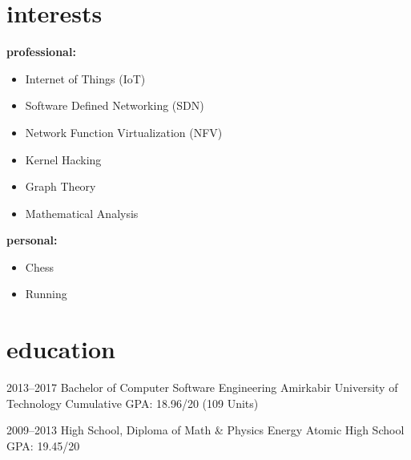 \documentclass[]{friggeri-cv} %
\begin{document}

\section{interests}
\textbf{professional:}
\begin{itemize}
	\item Internet of Things (IoT)
	\item Software Defined Networking (SDN)
	\item Network Function Virtualization (NFV)
	\item Kernel Hacking
	\item Graph Theory
	\item Mathematical Analysis
\end{itemize}
\textbf{personal:}
\begin{itemize}	
	\item Chess
	\item Running
\end{itemize}



\section{education}

\begin{entrylist}


	\entry
	{2013--2017}
	{Bachelor {\normalfont of Computer Software Engineering}}
	{Amirkabir University of Technology}
	{Cumulative GPA: 18.96/20 (109 Units)}


	\entry
	{2009--2013}
	{High School, {\normalfont Diploma of Math \& Physics}}
	{Energy Atomic High School}
	{GPA: 19.45/20}



\end{entrylist}

\end{document}
